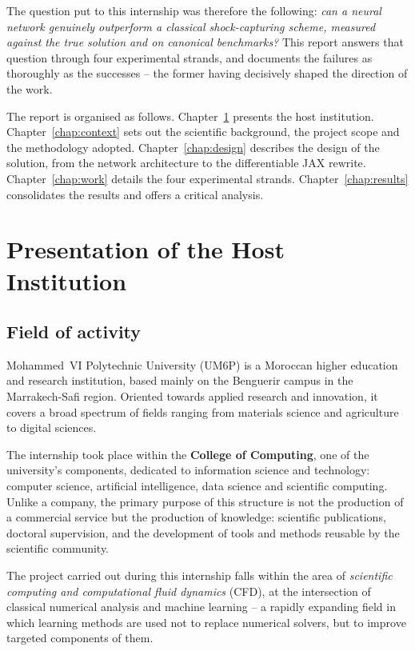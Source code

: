 \documentclass[12pt,a4paper,oneside]{report}
\begin{document}
The question put to this internship was therefore the following: \emph{can a
neural network genuinely outperform a classical shock-capturing scheme,
measured against the true solution and on canonical benchmarks?} This report
answers that question through four experimental strands, and documents the
failures as thoroughly as the successes -- the former having decisively shaped
the direction of the work.

The report is organised as follows. Chapter~\ref{chap:company} presents the
host institution. Chapter~\ref{chap:context} sets out the scientific
background, the project scope and the methodology adopted.
Chapter~\ref{chap:design} describes the design of the solution, from the
network architecture to the differentiable JAX rewrite.
Chapter~\ref{chap:work} details the four experimental strands.
Chapter~\ref{chap:results} consolidates the results and offers a critical
analysis.

\chapter{Presentation of the Host Institution}
\label{chap:company}

\section{Field of activity}

Mohammed~VI Polytechnic University (UM6P) is a Moroccan higher education and
research institution, based mainly on the Benguerir campus in the
Marrakech-Safi region. Oriented towards applied research and innovation, it
covers a broad spectrum of fields ranging from materials science and
agriculture to digital sciences.

The internship took place within the \textbf{College of Computing}, one of the
university's components, dedicated to information science and technology:
computer science, artificial intelligence, data science and scientific
computing. Unlike a company, the primary purpose of this structure is not the
production of a commercial service but the production of knowledge: scientific
publications, doctoral supervision, and the development of tools and methods
reusable by the scientific community.

The project carried out during this internship falls within the area of
\emph{scientific computing and computational fluid dynamics} (CFD), at the
intersection of classical numerical analysis and machine learning -- a rapidly
expanding field in which learning methods are used not to replace numerical
solvers, but to improve targeted components of them.
\end{document}
